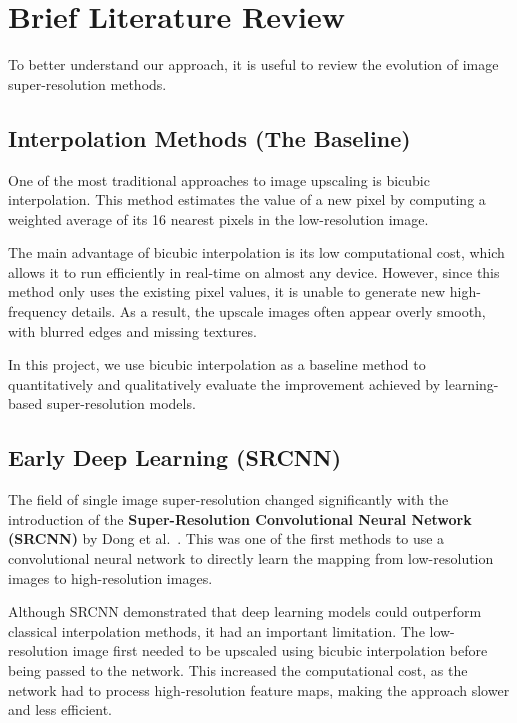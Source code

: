 \documentclass[a4paper,11pt]{article}
\begin{document}
\section{Brief Literature Review}

To better understand our approach, it is useful to review the evolution of image super-resolution methods.

\subsection{Interpolation Methods (The Baseline)}
One of the most traditional approaches to image upscaling is bicubic interpolation.
This method estimates the value of a new pixel by computing a weighted average of its
16 nearest pixels in the low-resolution image.

\medskip


The main advantage of bicubic interpolation is its low computational cost, which allows
it to run efficiently in real-time on almost any device. However, since this method only
uses the existing pixel values, it is unable to generate new high-frequency details. As a
result, the upscale images often appear overly smooth, with blurred edges and missing
textures.

\medskip


In this project, we use bicubic interpolation as a baseline method to quantitatively and
qualitatively evaluate the improvement achieved by learning-based super-resolution
models.

\subsection{Early Deep Learning (SRCNN)}
The field of single image super-resolution changed significantly with the introduction of the
\textbf{Super-Resolution Convolutional Neural Network (SRCNN)} by Dong et al.~\cite{dong2014}.
This was one of the first methods to use a convolutional neural network to directly learn the mapping from low-resolution images to high-resolution images.

\medskip



Although SRCNN demonstrated that deep learning models could outperform classical interpolation methods, it had an important limitation. The low-resolution image first needed to be upscaled using bicubic interpolation before being passed to the network. This increased the computational cost, as the network had to process high-resolution feature maps, making the approach slower and less efficient.
\end{document}

